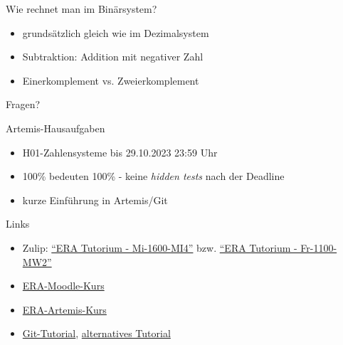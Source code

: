 \begin{frame}[c]{Wie rechnet man im Binärsystem?}{}
	\begin{itemize}
		\item grundsätzlich gleich wie im Dezimalsystem
		\item Subtraktion: Addition mit negativer Zahl
		\item Einerkomplement vs. Zweierkomplement
	\end{itemize}
\end{frame}

\begin{frame}[c]{}{}
	\begin{center}
		\LARGE Fragen?
	\end{center}
\end{frame}

\begin{frame}[c]{Artemis-Hausaufgaben}{}
	\begin{itemize}
		\item H01-Zahlensysteme bis 29.10.2023 23:59 Uhr
		\item 100\% bedeuten 100\% - keine \emph{hidden tests} nach der Deadline
		\item kurze Einführung in Artemis/Git
	\end{itemize}
\end{frame}

\begin{frame}[fragile, c]{Links}{}
	\begin{itemize}
		\item Zulip: \href{https://zulip.in.tum.de/#narrow/stream/1917-ERA-Tutorium---Mi-1600-MI4}{\enquote{ERA Tutorium - Mi-1600-MI4}}
		      bzw. \href{https://zulip.in.tum.de/#narrow/stream/1940-ERA-Tutorium---Fr-1100-MW2}{\enquote{ERA Tutorium - Fr-1100-MW2}}
		\item \href{https://www.moodle.tum.de/course/view.php?id=90679}{ERA-Moodle-Kurs}
		\item \href{https://artemis.in.tum.de/courses/288/exercises}{ERA-Artemis-Kurs}
		\item \href{https://git-scm.com/docs/gittutorial}{Git-Tutorial}, \href{https://rogerdudler.github.io/git-guide/}{alternatives Tutorial}
	\end{itemize}
\end{frame}

\maketitle


